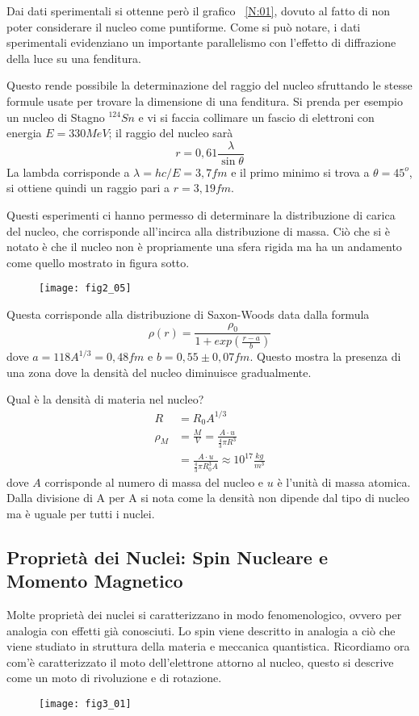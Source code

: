 Dai dati sperimentali si ottenne però il grafico ~\ref{N:01}, dovuto al fatto di non poter considerare il nucleo come puntiforme.
Come si può notare, i dati sperimentali evidenziano un importante parallelismo con l'effetto di diffrazione della luce su una fenditura.

Questo rende possibile la determinazione del raggio del nucleo sfruttando le stesse formule usate per trovare la dimensione di una fenditura.
Si prenda per esempio un nucleo di Stagno $^{124}Sn$ e vi si faccia collimare un fascio di elettroni con energia $E=330MeV$;
il raggio del nucleo sarà
\begin{equation}
r=0,61 \frac{\lambda}{\sin\theta}
\end{equation} 
La lambda corrisponde a $\lambda=hc/E=3,7fm$ e il primo minimo si trova a $\theta=45^o$, si ottiene quindi un raggio pari a $r=3,19fm$.

Questi esperimenti ci hanno permesso di determinare la distribuzione di carica del nucleo, che corrisponde all'incirca alla distribuzione di massa.
Ciò che si è notato è che il nucleo non è propriamente una sfera rigida ma ha un andamento come quello mostrato in figura sotto.
\begin{figure}[h]
\centering
\texttt{[image: fig2\_05]}
\end{figure}
Questa corrisponde alla distribuzione di Saxon-Woods data dalla formula
\begin{equation}
\rho(r)=\frac{\rho_0}{1+exp\left(\frac{r-a}{b}\right)}
\end{equation}
dove $a=118A^{1/3}=0,48fm$ e $b=0,55\pm 0,07fm$.
Questo mostra la presenza di una zona dove la densità del nucleo diminuisce gradualmente.

Qual è la densità di materia nel nucleo?
\begin{equation}
\begin{split}
R&=R_0A^{1/3}\\
\rho_{M}&=\frac{M}{V}=\frac{A\cdot u}{\frac{4}{3}\pi R^3}\\
&=\frac{A\cdot u}{\frac{4}{3}\pi R_0^3A}\approx10^{17}\frac{kg}{m^3}
\end{split}
\end{equation}
dove $A$ corrisponde al numero di massa del nucleo e $u$ è l'unità di massa atomica. 
Dalla divisione di A per A si nota come la densità non dipende dal tipo di nucleo ma è uguale per tutti i nuclei.


\subsection{Proprietà dei Nuclei: Spin Nucleare e Momento Magnetico}
Molte proprietà dei nuclei si caratterizzano in modo fenomenologico, ovvero per analogia con effetti già conosciuti.
Lo spin viene descritto in analogia a ciò che viene studiato in struttura della materia e meccanica quantistica. 
Ricordiamo ora com'è caratterizzato il moto dell'elettrone attorno al nucleo, questo si descrive come un moto di rivoluzione e di rotazione.
\begin{figure}[h]
\centering
\texttt{[image: fig3\_01]}
\end{figure}


